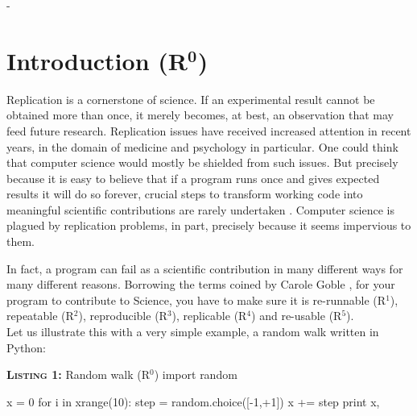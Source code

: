-
\section*{Introduction (R$^{\mathbf 0}$)}

Replication is a cornerstone of science. 
% 
% 
% 
% 
% 
% 
%
%
If an experimental result cannot be obtained more than once,
it merely becomes, at best, an observation that
may feed future research. 
Replication issues have received increased attention in recent years,
in the domain of medicine and psychology in particular.
One could think that computer science would mostly be shielded from such issues.
But precisely because it is easy to believe that
if a program runs once and gives expected results it will do so forever, 
crucial steps to transform working code into meaningful scientific contributions are rarely undertaken \cite{Collberg:2016}. 
Computer science is plagued by replication problems,
in part, precisely because it seems impervious to them.

In fact, a program can fail as a scientific contribution
in many different ways for many different reasons.
Borrowing the terms coined by Carole Goble \cite{Goble:2016},
for your program to contribute to Science,
you have to make sure it is
re-runnable (R$^1$),
repeatable (R$^2$),
reproducible (R$^3$),
replicable (R$^4$)
and re-usable (R$^5$).\\

Let us illustrate this with a very simple example,
a random walk written in Python:

\begin{code}{\textbf{\textsc{Listing 1:}} Random walk (R$^0$)}
import random

x = 0
for i in xrange(10):
    step = random.choice([-1,+1])
    x += step
    print x,
\end{code}


